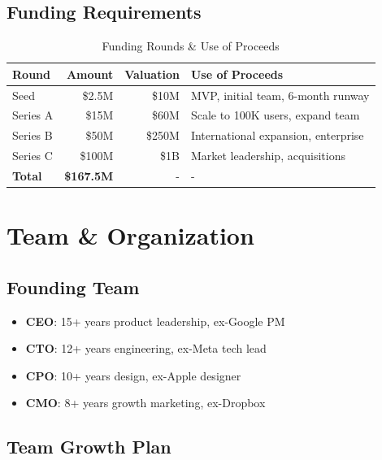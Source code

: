 \subsection{Funding Requirements}

\begin{table}[H]
\centering
\caption{Funding Rounds \& Use of Proceeds}
\begin{tabular}{|l|r|r|p{5cm}|}
\hline
\rowcolor{lightgray}
\textbf{Round} & \textbf{Amount} & \textbf{Valuation} & \textbf{Use of Proceeds} \\
\hline
Seed & \$2.5M & \$10M & MVP, initial team, 6-month runway \\
\hline
Series A & \$15M & \$60M & Scale to 100K users, expand team \\
\hline
Series B & \$50M & \$250M & International expansion, enterprise \\
\hline
Series C & \$100M & \$1B & Market leadership, acquisitions \\
\hline
\textbf{Total} & \textbf{\$167.5M} & - & - \\
\hline
\end{tabular}
\end{table}

\section{Team \& Organization}

\subsection{Founding Team}

\begin{itemize}
    \item \textbf{CEO}: 15+ years product leadership, ex-Google PM
    \item \textbf{CTO}: 12+ years engineering, ex-Meta tech lead
    \item \textbf{CPO}: 10+ years design, ex-Apple designer
    \item \textbf{CMO}: 8+ years growth marketing, ex-Dropbox
\end{itemize}

\subsection{Team Growth Plan}

